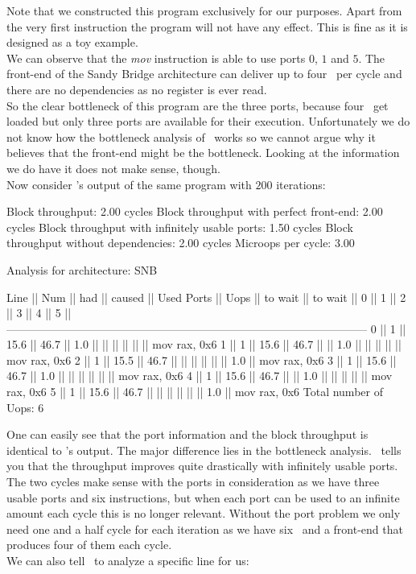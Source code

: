 Note that we constructed this program exclusively for our purposes. Apart from the very first instruction the program will not have any effect. This is fine as it is designed as a toy example.\\
We can observe that the \emph{mov} instruction is able to use ports $0$, $1$ and $5$. The front-end of the Sandy Bridge architecture can deliver up to four \microops\ per cycle and there are no dependencies as no register is ever read.\\
So the clear bottleneck of this program are the three ports, because four \microops\ get loaded but only three ports are available for their execution. Unfortunately we do not know how the bottleneck analysis of \iaca\ works so we cannot argue why it believes that the front-end might be the bottleneck. Looking at the information we do have it does not make sense, though.\\


Now consider \suaca's output of the same program with $200$ iterations:

\begin{example}
Block throughput: 2.00 cycles
Block throughput with perfect front-end: 2.00 cycles
Block throughput with infinitely usable ports: 1.50 cycles
Block throughput without dependencies: 2.00 cycles
Microops per cycle: 3.00
       
Analysis for architecture: SNB
        
 Line  ||   Num   ||   had   || caused  ||            Used Ports
       ||   Uops  || to wait || to wait ||   0   ||   1   ||   2   ||   3   ||   4   ||   5   ||
 ------------------------------------------------------------------------------------------------
   0   ||    1    ||  15.6   ||  46.7   ||  1.0  ||       ||       ||       ||       ||       || mov rax, 0x6
   1   ||    1    ||  15.6   ||  46.7   ||       ||  1.0  ||       ||       ||       ||       || mov rax, 0x6
   2   ||    1    ||  15.5   ||  46.7   ||       ||       ||       ||       ||       ||  1.0  || mov rax, 0x6
   3   ||    1    ||  15.6   ||  46.7   ||  1.0  ||       ||       ||       ||       ||       || mov rax, 0x6
   4   ||    1    ||  15.6   ||  46.7   ||       ||  1.0  ||       ||       ||       ||       || mov rax, 0x6
   5   ||    1    ||  15.6   ||  46.7   ||       ||       ||       ||       ||       ||  1.0  || mov rax, 0x6
Total number of Uops: 6
\end{example}

One can easily see that the port information and the block throughput is identical to \iaca's output. The major difference lies in the bottleneck analysis. \suaca\ tells you that the throughput improves quite drastically with infinitely usable ports. The two cycles make sense with the ports in consideration as we have three usable ports and six instructions, but when each port can be used to an infinite amount each cycle this is no longer relevant. Without the port problem we only need one and a half cycle for each iteration as we have six \microops\ and a front-end that produces four of them each cycle.\\
We can also tell \suaca\ to analyze a specific line for us:

